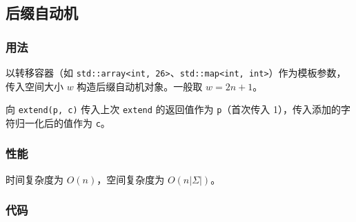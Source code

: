 \subsection{后缀自动机}

\subsubsection{用法}

以转移容器（如 \lstinline{std::array<int, 26>}、\lstinline{std::map<int, int>}）作为模板参数，传入空间大小 $w$ 构造后缀自动机对象。一般取 $w = 2n + 1$。

向 \lstinline{extend(p, c)} 传入上次 \lstinline{extend} 的返回值作为 \lstinline{p}（首次传入 1），传入添加的字符归一化后的值作为 \lstinline{c}。

\subsubsection{性能}

时间复杂度为 $O(n)$，空间复杂度为 $O(n |\Sigma|)$。

\subsubsection{代码}


